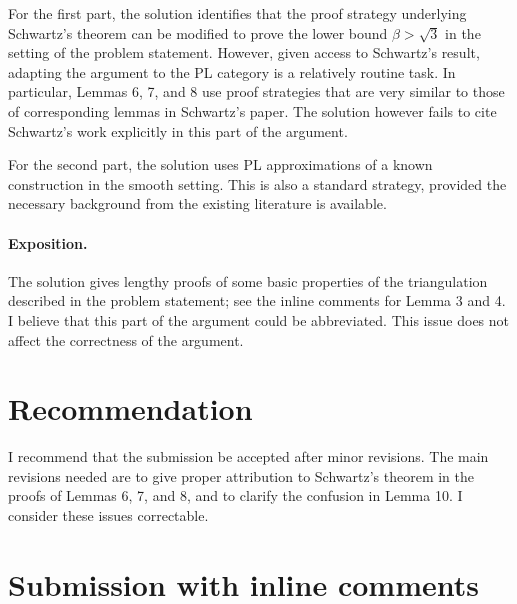 \documentclass[12pt]{article}
\theoremstyle{plain}
\begin{document}
For the first part, the solution identifies that the proof strategy underlying Schwartz's theorem can be modified to prove the lower bound $\beta > \sqrt{3}$ in the setting of the problem statement. However, given access to Schwartz's result, adapting the argument to the PL category is a relatively routine task. In particular, Lemmas 6, 7, and 8 use proof strategies that are very similar to those of corresponding lemmas in Schwartz's paper. The solution however fails to cite Schwartz's work explicitly in this part of the argument.

For the second part, the solution uses PL approximations of a known construction in the smooth setting. This is also a standard strategy, provided the necessary background from the existing literature is available. 

\paragraph{Exposition.}

The solution gives lengthy proofs of some basic properties of the triangulation described in the problem statement; see the inline comments for Lemma 3 and 4. I believe that this part of the argument could be abbreviated. This issue does not affect the correctness of the argument.

\section{Recommendation}

  I recommend that the submission be accepted after minor revisions. The main revisions needed are to give proper attribution to Schwartz's theorem in the proofs of Lemmas 6, 7, and 8, and to clarify the confusion in Lemma 10. I consider these issues correctable.

  \section{Submission with inline comments}


\date{}
\end{document}

